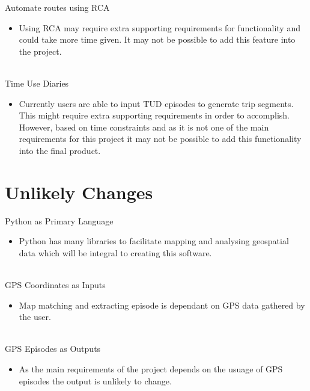 \documentclass[12pt, titlepage]{article}
\begin{document}
Automate routes using RCA
\begin{itemize}
\item Using RCA may require extra supporting requirements for functionality and could take more time given. It may not be possible to add this feature into the project.
\end{itemize}
\\
Time Use Diaries
\begin{itemize}
\item Currently users are able to input TUD episodes to generate trip segments. This might require extra supporting requirements in order to accomplish. However, based on time constraints and as it is not one of the main requirements for this project it may not be possible to add this functionality into the final product.
\end{itemize}

\section{Unlikely Changes}

Python as Primary Language
\begin{itemize}
\item Python has many libraries to facilitate mapping and analysing geospatial data which will be integral to creating this software. 
\end{itemize}
\\
GPS Coordinates as Inputs
\begin{itemize}
\item Map matching and extracting episode is dependant on GPS data gathered by the user. 
\end{itemize}
\\
GPS Episodes as Outputs 
\begin{itemize}
\item As the main requirements of the project depends on the usuage of GPS episodes the output is unlikely to change.
\end{itemize}
\end{document}
